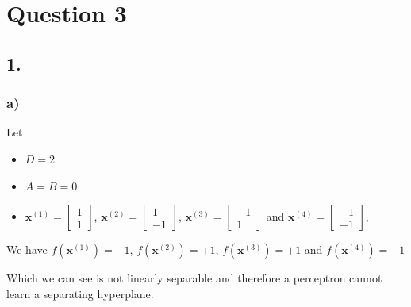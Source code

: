 \documentclass[11pt]{article}
\begin{document}
\clearpage

\section{Question 3}
\subsection{1.}
\subsubsection{a)}
Let
\begin{itemize}
  \item $D = 2$
  \item $A = B = 0$
  \item $\bm{x}^{(1)} = \begin{bmatrix} 1 \\ 1\end{bmatrix}$, $\bm{x}^{(2)} = \begin{bmatrix} 1 \\ -1\end{bmatrix}$, $\bm{x}^{(3)} = \begin{bmatrix} -1 \\ 1\end{bmatrix}$ and $\bm{x}^{(4)} = \begin{bmatrix} -1 \\ -1\end{bmatrix}$, 
  \end{itemize}
  We have $f ( \bm{x}^{(1)}) = -1$, $f ( \bm{x}^{(2)}) = +1$, $f ( \bm{x}^{(3)}) = +1$ and $f ( \bm{x}^{(4)}) = -1$

  \begin{figure}[H]
  \end{figure}
  Which we can see is not linearly separable and therefore a perceptron cannot learn a separating hyperplane.
\end{document}
